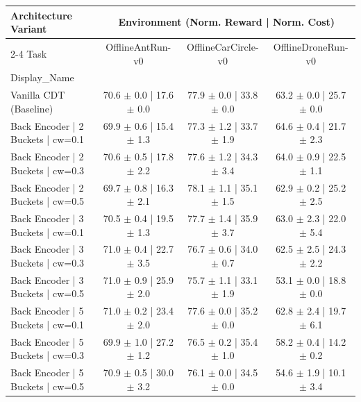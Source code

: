 \begin{tabular}{lccc}
\toprule
\multirow{2}{*}{\textbf{Architecture Variant}} & \multicolumn{3}{c}{\textbf{Environment (Norm. Reward | Norm. Cost)}} \\
\cmidrule{2-4}
Task & OfflineAntRun-v0 & OfflineCarCircle-v0 & OfflineDroneRun-v0 \\
Display_Name &  &  &  \\
\midrule
Vanilla CDT (Baseline) & 70.6 $\pm$ 0.0  |  17.6 $\pm$ 0.0 & 77.9 $\pm$ 0.0  |  33.8 $\pm$ 0.0 & 63.2 $\pm$ 0.0  |  25.7 $\pm$ 0.0 \\
Back Encoder | 2 Buckets | cw=0.1 & 69.9 $\pm$ 0.6  |  15.4 $\pm$ 1.3 & 77.3 $\pm$ 1.2  |  33.7 $\pm$ 1.9 & 64.6 $\pm$ 0.4  |  21.7 $\pm$ 2.3 \\
Back Encoder | 2 Buckets | cw=0.3 & 70.6 $\pm$ 0.5  |  17.8 $\pm$ 2.2 & 77.6 $\pm$ 1.2  |  34.3 $\pm$ 3.4 & 64.0 $\pm$ 0.9  |  22.5 $\pm$ 1.1 \\
Back Encoder | 2 Buckets | cw=0.5 & 69.7 $\pm$ 0.8  |  16.3 $\pm$ 2.1 & 78.1 $\pm$ 1.1  |  35.1 $\pm$ 1.5 & 62.9 $\pm$ 0.2  |  25.2 $\pm$ 2.5 \\
Back Encoder | 3 Buckets | cw=0.1 & 70.5 $\pm$ 0.4  |  19.5 $\pm$ 1.3 & 77.7 $\pm$ 1.4  |  35.9 $\pm$ 3.7 & 63.0 $\pm$ 2.3  |  22.0 $\pm$ 5.4 \\
Back Encoder | 3 Buckets | cw=0.3 & 71.0 $\pm$ 0.4  |  22.7 $\pm$ 3.5 & 76.7 $\pm$ 0.6  |  34.0 $\pm$ 0.7 & 62.5 $\pm$ 2.5  |  24.3 $\pm$ 2.2 \\
Back Encoder | 3 Buckets | cw=0.5 & 71.0 $\pm$ 0.9  |  25.9 $\pm$ 2.0 & 75.7 $\pm$ 1.1  |  33.1 $\pm$ 1.9 & 53.1 $\pm$ 0.0  |  18.8 $\pm$ 0.0 \\
Back Encoder | 5 Buckets | cw=0.1 & 71.0 $\pm$ 0.2  |  23.4 $\pm$ 2.0 & 77.6 $\pm$ 0.0  |  35.2 $\pm$ 0.0 & 62.8 $\pm$ 2.4  |  19.7 $\pm$ 6.1 \\
Back Encoder | 5 Buckets | cw=0.3 & 69.9 $\pm$ 1.0  |  27.2 $\pm$ 1.2 & 76.5 $\pm$ 0.2  |  35.4 $\pm$ 1.0 & 58.2 $\pm$ 0.4  |  14.2 $\pm$ 0.2 \\
Back Encoder | 5 Buckets | cw=0.5 & 70.9 $\pm$ 0.5  |  30.0 $\pm$ 3.2 & 76.1 $\pm$ 0.0  |  34.5 $\pm$ 0.0 & 54.6 $\pm$ 1.9  |  10.1 $\pm$ 3.4 \\
\bottomrule
\end{tabular}
